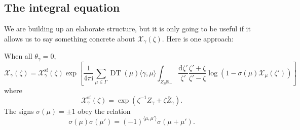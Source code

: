 \documentclass[12pt,letterpaper,reqno]{article}
\numberwithin{equation}{section}
\newcommand{\cM}{\ensuremath{\mathcal M}}
\newcommand{\cX}{\ensuremath{\mathcal X}}
\newcommand{\cW}{\ensuremath{\mathcal W}}
\newcommand{\bbR}{\ensuremath{\mathbb R}}
\newcommand{\I}{{\mathrm i}}
\newcommand{\de}{\mathrm{d}}
\renewcommand{\sf}{\mathrm{sf}}
\newcommand{\IP}[1]{\langle#1\rangle}
\newcommand{\vphi}{{\vec\phi}}
\newcommand{\ti}[1]{\textit{#1}}
\DeclareMathOperator{\DT}{DT}
\newcommand{\SU}{\mathrm{SU}}
\begin{document}

\subsection{The integral equation} \label{sec:integral-equations}

We are building up an elaborate structure,
but it is only going to be useful if it allows
us to say something concrete about
$\cX_\gamma(\zeta)$. Here is one approach:

\begin{conj}[Integral equation for $\theta_\gamma = 0$] \label{conj:integral-equation}
When all $\theta_\gamma = 0$,
\begin{equation} \label{eq:integral-equation}
  \cX_\gamma(\zeta) = \cX_\gamma^\sf(\zeta) \exp \left[ \frac{1}{4\pi \I} \sum_{\mu \in \Gamma} \DT(\mu) \IP{\gamma,\mu} \int_{Z_\mu \bbR_-} \frac{\de \zeta'}{\zeta'} \frac{\zeta' + \zeta}{\zeta'-\zeta} \log(1 - \sigma(\mu) \cX_\mu(\zeta')) \right]
\end{equation}
where 
\begin{equation}
  \cX_\gamma^\sf(\zeta) = \exp \left( \zeta^{-1} Z_\gamma + \zeta \overline{Z}_\gamma \right).
\end{equation}
The signs $\sigma(\mu) = \pm 1$ obey the relation
\begin{equation}
  \sigma(\mu) \sigma(\mu') = (-1)^{\IP{\mu,\mu'}} \sigma(\mu + \mu').
\end{equation}
\end{conj}
\end{document}
